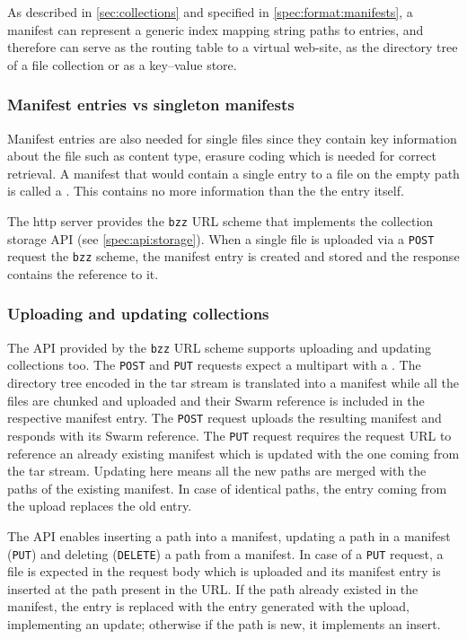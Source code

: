 As described in \ref{sec:collections} and specified in \ref{spec:format:manifests}, a manifest can represent a generic index mapping string paths to entries, and therefore can serve as the routing table to a virtual web-site, as the directory tree of a file collection or as a key--value store. 

\subsubsection{Manifest entries vs singleton manifests}

Manifest entries are also needed for single files since they contain key information about the file such as content type, erasure coding which is needed for correct retrieval. A manifest that would contain a single entry to a file on  the empty path is called a . This contains no more information than the the entry itself.  

The http server provides the \lstinline{bzz} URL scheme that implements the collection storage API (see  \ref{spec:api:storage}). When a single file is uploaded via a \lstinline{POST} request the \lstinline{bzz} scheme, the manifest entry is created and stored and the response contains the reference to it.

\subsubsection{Uploading and updating collections}

The API provided by the \lstinline{bzz} URL scheme supports uploading and updating collections too. The \lstinline{POST} and \lstinline{PUT} requests expect a multipart with a . The directory tree encoded in the tar stream is translated into a manifest while all the files are chunked and uploaded and their Swarm reference is included in the respective manifest entry. The \lstinline{POST} request uploads the resulting manifest and responds with its Swarm reference. The \lstinline{PUT} request requires the request URL to reference an already existing manifest which is updated with the one coming from the tar stream. Updating here means all the new paths are merged with the paths of the existing manifest. In case of identical paths, the entry coming from the upload replaces the old entry.

The API enables inserting a path into a manifest, updating a path in a manifest (\lstinline{PUT}) and deleting (\lstinline{DELETE}) a path from a manifest. In case of a \lstinline{PUT} request, a file is expected in the request body which is uploaded and its manifest entry is inserted at the path present in the URL. If the path already existed in the manifest, the entry is replaced with the entry generated with the upload, implementing an update; otherwise if the path is new, it implements an insert. 

